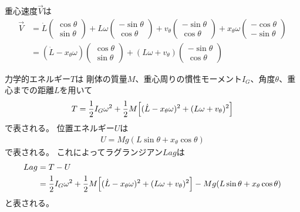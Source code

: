 \documentclass[a4paper,11pt]{jsarticle}
\begin{document}
重心速度$\vec{V}$は
\begin{align}
  \vec{V} &= 
  \dot{L}
  \begin{pmatrix}
    \cos\theta
    \\
    \sin\theta
  \end{pmatrix}
  + L\omega
  \begin{pmatrix}
    -\sin\theta
    \\
    \cos\theta
  \end{pmatrix}
  + v_\theta \begin{pmatrix}
    -\sin\theta
    \\
    \cos\theta
  \end{pmatrix}
  + x_\theta \omega \begin{pmatrix}
    -\cos\theta
    \\
    -\sin\theta
  \end{pmatrix}
  \\
  &= 
  ( \dot{L} - x_\theta \omega )
  \begin{pmatrix}
    \cos\theta
    \\
    \sin\theta
  \end{pmatrix}
  + ( L\omega + v_\theta )
  \begin{pmatrix}
    -\sin\theta
    \\
    \cos\theta
  \end{pmatrix}
\end{align}


力学的エネルギー$T$は
剛体の質量$M$、重心周りの慣性モーメント$I_G$、角度$\theta$、重心までの距離$L$を用いて
\begin{align}
  T = 
  \frac{1}{2}I_G\omega^2
  + \frac{1}{2}M
  \Bigl[ (\dot{L} - x_\theta \omega)^2 + (L\omega + v_\theta)^2 \Bigr]
\end{align}
で表される。
位置エネルギー$U$は
\begin{align}
  U = Mg ( L\sin\theta + x_\theta \cos\theta )
\end{align}
で表される。
これによってラグランジアン$Lag$は
\begin{align}
  Lag &=
  T - U
  \\
  &= 
  \frac{1}{2}I_G\omega^2
  + \frac{1}{2}M
  \Bigl[ (\dot{L} - x_\theta \omega)^2 + (L\omega + v_\theta)^2 \Bigr]
  - Mg ( L\sin\theta + x_\theta \cos\theta )
\end{align}
と表される。
\end{document}

